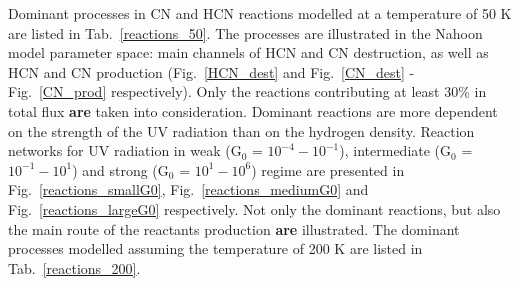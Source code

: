 \documentclass{aa}
\begin{document}
\begin{appendix}
Dominant processes in CN and HCN reactions modelled at a temperature of 50 K are listed in Tab.~\ref{reactions_50}. The processes are illustrated in the Nahoon model parameter space: main channels of HCN and CN destruction, as well as HCN and CN production (Fig.~\ref{HCN_dest} and Fig.~\ref{CN_dest} - Fig.~\ref{CN_prod} respectively). Only the reactions contributing at least 30\% in total flux \textbf{are} taken into consideration. Dominant reactions are more dependent on the strength of the UV radiation than on the hydrogen density. Reaction networks for UV radiation in weak (G$_0$ = $10^{-4} - 10^{-1}$), intermediate (G$_0$ = $10^{-1} - 10^{1}$) and strong (G$_0$ = $10^{1} - 10^{6}$) regime are presented in Fig.~\ref{reactions_smallG0}, Fig.~\ref{reactions_mediumG0} and Fig.~\ref{reactions_largeG0} respectively. Not only the dominant reactions, but also the main route of the reactants production \textbf{are} illustrated. The dominant processes modelled assuming the temperature of 200 K are listed in Tab.~\ref{reactions_200}.


\end{appendix}
\end{document}
